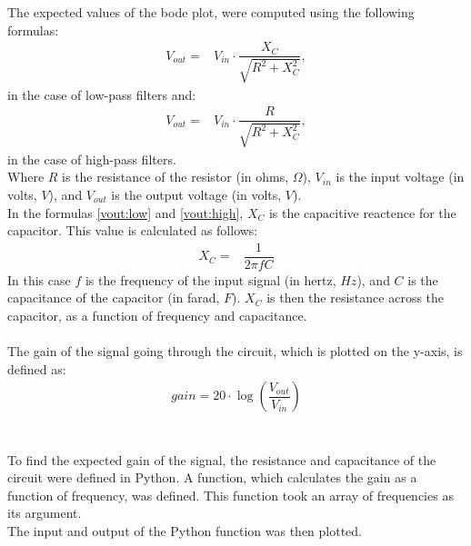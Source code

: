 The expected values of the bode plot, were computed using the following formulas:
\begin{align} \label{vout:low}
	V_{out} =& V_{in} \cdot \dfrac{X_C}{\sqrt{R^2+X_{C}^2}},
\end{align}
in the case of low-pass filters and:
\begin{align} \label{vout:high}
	V_{out} =& V_{in} \cdot \dfrac{R}{\sqrt{R^2+X_{C}^2}},
\end{align}
in the case of high-pass filters. \\
Where $R$ is the resistance of the resistor (in ohms, $\Omega$), $V_{in}$ is the input voltage (in volts, $V$), and $V_{out}$ is the output voltage (in volts, $V$).
\\
In the formulas \eqref{vout:low} and \eqref{vout:high}, $X_C$ is the capacitive reactence for the capacitor. This value is calculated as follows:
\begin{align*}
	X_C =& \dfrac{1}{2\pi fC}
\end{align*}
In this case $f$ is the frequency of the input signal (in hertz, $Hz$), and $C$ is the capacitance of the capacitor (in farad, $F$). $X_C$ is then the resistance across the capacitor, as a function of frequency and capacitance.
\\
\\
The gain of the signal going through the circuit, which is plotted on the y-axis, is defined as:
\begin{align*}
	gain = 20 \cdot \log{\left( \dfrac{V_{out}}{V_{in}} \right)}
\end{align*}
\\
\\
To find the expected gain of the signal, the resistance and capacitance of the circuit were defined in Python. A function, which calculates the gain as a function of frequency, was defined. This function took an array of frequencies as its argument.
\\
The input and output of the Python function was then plotted.